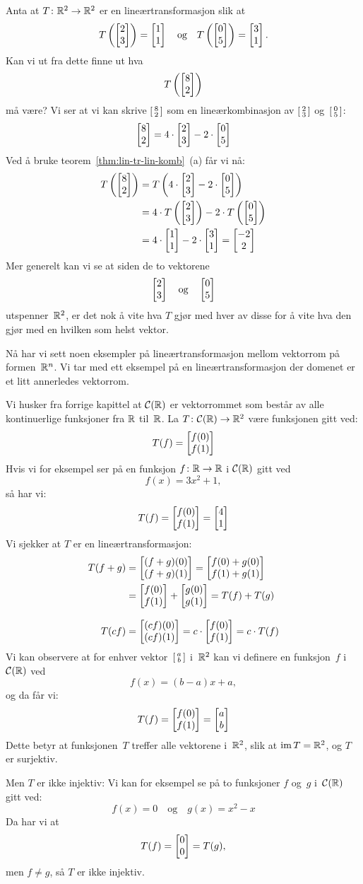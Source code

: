 \begin{ex}
Anta at $T \colon \R^2 \to \R^2$ er en lineærtransformasjon slik at
\[
T\left( \vv{2}{3} \right) = \vv{1}{1}
\quad\text{og}\quad
T\left( \vv{0}{5} \right) = \vv{3}{1}.
\]
Kan vi ut fra dette finne ut hva
\[
T\left( \vv{8}{2} \right)
\]
må være?  Vi ser at vi kan skrive $\vvS{8}{2}$ som en
lineærkombinasjon av $\vvS{2}{3}$ og~$\vvS{0}{5}$:
\[
\vv{8}{2} = 4 \cdot \vv{2}{3} - 2 \cdot \vv{0}{5}
\]
Ved å bruke teorem~\ref{thm:lin-tr-lin-komb}~(a) får vi nå:
\begin{align*}
T\left( \vv{8}{2} \right)
&= T\left( 4 \cdot \vv{2}{3} - 2 \cdot \vv{0}{5} \right) \\
&= 4 \cdot T\left( \vv{2}{3} \right) - 2 \cdot T\left( \vv{0}{5} \right) \\
&= 4 \cdot \vv{1}{1} - 2 \cdot \vv{3}{1}
 = \vv{-2}{2}
\end{align*}
Mer generelt kan vi se at siden de to vektorene
\[
\vv{2}{3}
\quad\text{og}\quad
\vv{0}{5}
\]
utspenner~$\R^2$, er det nok å vite hva $T$ gjør med hver av disse for
å vite hva den gjør med en hvilken som helst vektor.
\end{ex}

Nå har vi sett noen eksempler på lineærtransformasjon mellom vektorrom
på formen~$\R^n$.  Vi tar med ett eksempel på en lineærtransformasjon
der domenet er et litt annerledes vektorrom.

\begin{ex}
Vi husker fra forrige kapittel at $\Cf(\R)$ er vektorrommet som består
av alle kontinuerlige funksjoner fra $\R$ til~$\R$.  La
$T \colon \Cf(\R) \to \R^2$ være funksjonen gitt ved:
\[
T(f) = \vv{f(0)}{f(1)}
\]
Hvis vi for eksempel ser på en funksjon $f \colon \R \to \R$ i
$\Cf(\R)$ gitt ved
\[
f(x) = 3x^2 + 1,
\]
så har vi:
\[
T(f) = \vv{f(0)}{f(1)} = \vv{4}{1}
\]
Vi sjekker at $T$ er en lineærtransformasjon:
\begin{align*}
T(f + g)
&= \vv{(f+g)(0)}{(f+g)(1)}
 = \vv{f(0) + g(0)}{f(1) + g(1)} \\
&= \vv{f(0)}{f(1)} + \vv{g(0)}{g(1)}
 = T(f) + T(g) \\[8pt]
T(cf)
&= \vv{(cf)(0)}{(cf)(1)}
 = c \cdot \vv{f(0)}{f(1)}
 = c \cdot T(f)
\end{align*}
Vi kan observere at for enhver vektor~$\vvS{a}{b}$ i~$\R^2$ kan vi
definere en funksjon~$f$ i~$\Cf(\R)$ ved
\[
f(x) = (b - a) x + a,
\]
og da får vi:
\[
T(f) = \vv{f(0)}{f(1)} = \vv{a}{b}
\]
Dette betyr at funksjonen~$T$ treffer alle vektorene i~$\R^2$, slik at
$\im T = \R^2$, og $T$ er surjektiv.

Men $T$ er ikke injektiv: Vi kan for eksempel se på to funksjoner $f$
og~$g$ i~$\Cf(\R)$ gitt ved:
\[
f(x) = 0
\quad\text{og}\quad
g(x) = x^2 - x
\]
Da har vi at
\[
T(f) = \vv{0}{0} = T(g),
\]
men $f \ne g$, så $T$ er ikke injektiv.
\end{ex}



